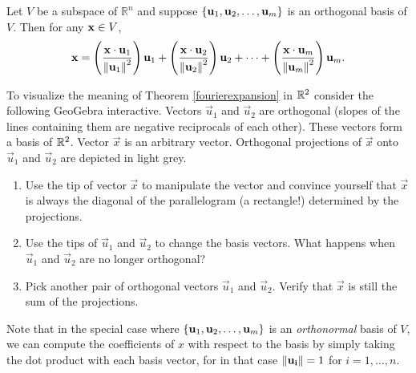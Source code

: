 \documentclass{ximera}
\begin{document}
\begin{theorem}\label{fourierexpansion}
Let $V$ be a subspace of $\mathbb{R}^n$ and suppose $\{ {\bf u}_1, {\bf u}_2, \ldots, {\bf u}_m \}$
is an orthogonal basis of $V$.
Then for any ${\bf x}\in V$,
\[ {\bf x} =
\left(\frac{{\bf x}\cdot {\bf u}_1}{\left\lVert{\bf u}_1\right\rVert^2}\right) {\bf u}_1 +
\left(\frac{{\bf x}\cdot {\bf u}_2}{\left\lVert{\bf u}_2\right\rVert^2}\right) {\bf u}_2 +
\cdots +
\left(\frac{{\bf x}\cdot {\bf u}_m}{\left\lVert{\bf u}_m\right\rVert^2}\right) {\bf u}_m.
\]
\end{theorem}

\begin{exploration}
    To visualize the meaning of Theorem \ref{fourierexpansion} in $\mathbb{R}^2$ consider the following GeoGebra interactive.  Vectors $\vec{u}_1$ and $\vec{u}_2$ are orthogonal (slopes of the lines containing them are negative reciprocals of each other).  These vectors form a basis of $\mathbb{R}^2$.  Vector $\vec{x}$ is an arbitrary vector.  Orthogonal projections of $\vec{x}$ onto $\vec{u}_1$ and $\vec{u}_2$ are depicted in light grey.
    \begin{enumerate}
        \item Use the tip of vector $\vec{x}$ to manipulate the vector and convince yourself that $\vec{x}$ is always the diagonal of the parallelogram (a rectangle!) determined by the projections.
        \item Use the tips of $\vec{u}_1$ and $\vec{u}_2$ to change the basis vectors.  What happens when $\vec{u}_1$ and $\vec{u}_2$ are no longer orthogonal?
        \item Pick another pair of orthogonal vectors $\vec{u}_1$ and $\vec{u}_2$.  Verify that $\vec{x}$ is still the sum of the projections.
    \end{enumerate}

    \begin{center}
\end{center}
\end{exploration}


Note that in the special case where $\{ {\bf u}_1, {\bf u}_2, \ldots, {\bf u}_m \}$
is an \emph{orthonormal} basis of $V$, we can compute the coefficients of $x$ with respect to the basis by simply taking the dot product with each basis vector, for in that case $\left\lVert\mathbf{u_i}\right\rVert = 1$ for $i=1,\ldots,n$. 
\end{document}
